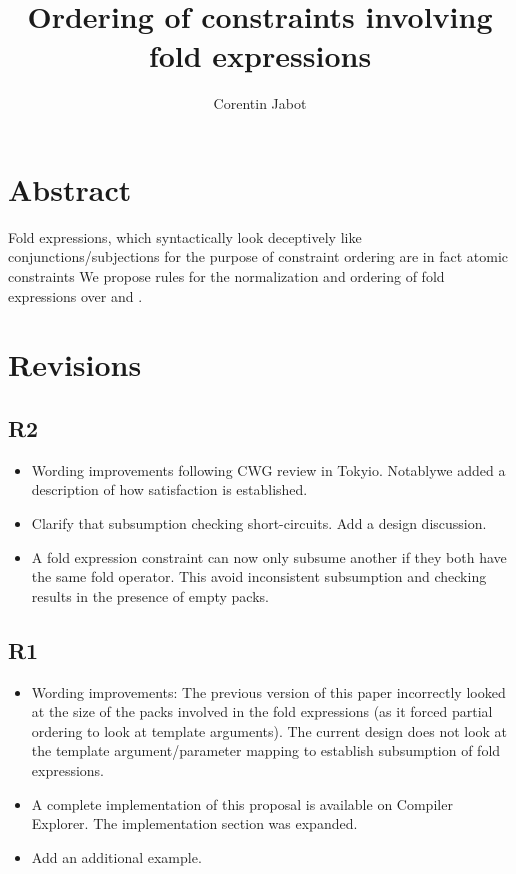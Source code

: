 \documentclass{wg21}
\title{Ordering of constraints involving fold expressions}
\author{Corentin Jabot}{corentin.jabot@gmail.com}
\begin{document}
\maketitle

\section{Abstract}

Fold expressions, which syntactically look deceptively like conjunctions/subjections for the purpose of constraint ordering are in fact atomic constraints
We propose rules for the normalization and ordering of fold expressions over \tcode{\&\&} and \tcode{||}.

\section{Revisions}

\subsection{R2}

\begin{itemize}
\item Wording improvements following CWG review in Tokyio. Notablywe added a description of how satisfaction is established.
\item Clarify that subsumption checking short-circuits. Add a design discussion.
\item A fold expression constraint can now only subsume another if they both have the same fold operator. This avoid inconsistent subsumption and checking results in the presence of empty packs.
\end{itemize}


\subsection{R1}

\begin{itemize}
\item Wording improvements: The previous version of this paper incorrectly looked at the size of the packs involved in the fold expressions (as it forced partial ordering to look at template arguments).
The current design does not look at the template argument/parameter mapping to establish subsumption of fold expressions.
\item A complete implementation of this proposal is available on Compiler Explorer. The implementation section was expanded.
\item Add an additional example.
\end{itemize}
\end{document}
